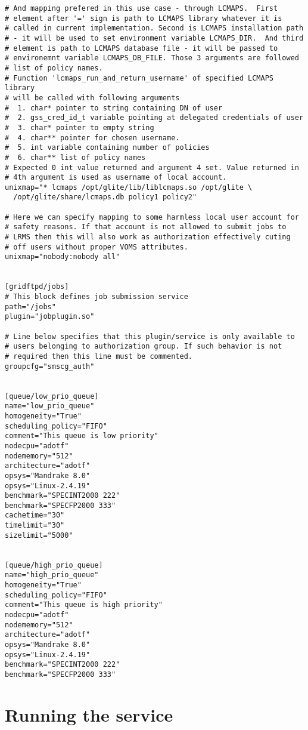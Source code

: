 \documentclass{article}
\begin{document}
\begin{verbatim}
# And mapping prefered in this use case - through LCMAPS.  First
# element after '=' sign is path to LCMAPS library whatever it is
# called in current implementation. Second is LCMAPS installation path
# - it will be used to set environment variable LCMAPS_DIR.  And third
# element is path to LCMAPS database file - it will be passed to
# environemnt variable LCMAPS_DB_FILE. Those 3 arguments are followed
# list of policy names.
# Function 'lcmaps_run_and_return_username' of specified LCMAPS library
# will be called with following arguments
#  1. char* pointer to string containing DN of user
#  2. gss_cred_id_t variable pointing at delegated credentials of user
#  3. char* pointer to empty string
#  4. char** pointer for chosen username.
#  5. int variable containing number of policies
#  6. char** list of policy names
# Expected 0 int value returned and argument 4 set. Value returned in
# 4th argument is used as username of local account.
unixmap="* lcmaps /opt/glite/lib/liblcmaps.so /opt/glite \
  /opt/glite/share/lcmaps.db policy1 policy2"

# Here we can specify mapping to some harmless local user account for
# safety reasons. If that account is not allowed to submit jobs to
# LRMS then this will also work as authorization effectively cuting
# off users without proper VOMS attributes.
unixmap="nobody:nobody all"


[gridftpd/jobs]
# This block defines job submission service
path="/jobs"
plugin="jobplugin.so"

# Line below specifies that this plugin/service is only available to
# users belonging to authorization group. If such behavior is not
# required then this line must be commented.
groupcfg="smscg_auth"


[queue/low_prio_queue]
name="low_prio_queue"
homogeneity="True"
scheduling_policy="FIFO"
comment="This queue is low priority"
nodecpu="adotf"
nodememory="512"
architecture="adotf"
opsys="Mandrake 8.0"
opsys="Linux-2.4.19"
benchmark="SPECINT2000 222"
benchmark="SPECFP2000 333"
cachetime="30"
timelimit="30"
sizelimit="5000"


[queue/high_prio_queue]
name="high_prio_queue"
homogeneity="True"
scheduling_policy="FIFO"
comment="This queue is high priority"
nodecpu="adotf"
nodememory="512"
architecture="adotf"
opsys="Mandrake 8.0"
opsys="Linux-2.4.19"
benchmark="SPECINT2000 222"
benchmark="SPECFP2000 333"
\end{verbatim}


\section{Running the service}
\end{document}
